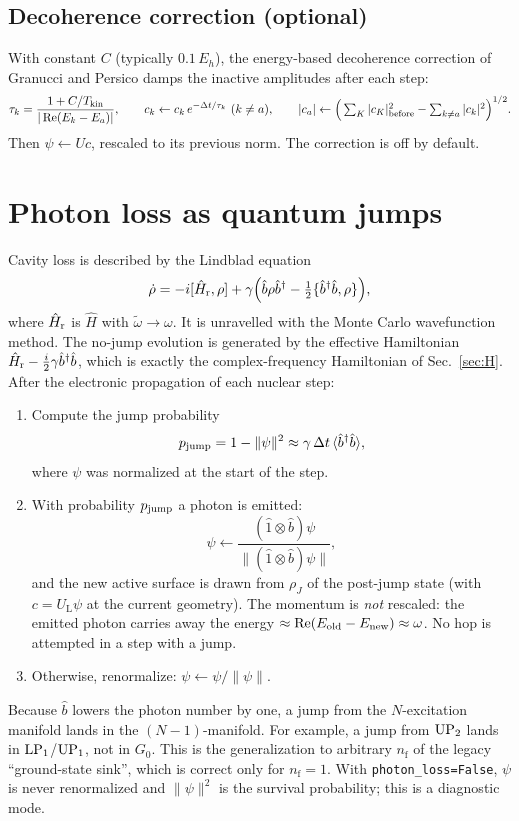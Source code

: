 \documentclass[11pt]{article}
\newcommand{\bdag}{\hat b^{\dagger}}
\newcommand{\bop}{\hat b}
\newcommand{\wt}{\tilde\omega}
\newcommand{\UL}{U_{\mathrm L}}
\newcommand{\Rep}{\operatorname{Re}}
\newcommand{\code}[1]{\texttt{#1}}
\newcommand{\nf}{n_{\mathrm f}}
\begin{document}
\subsection{Decoherence correction (optional)}
With constant $C$ (typically $0.1\,E_h$), the energy-based decoherence correction of Granucci and Persico damps the inactive amplitudes after each step:
\begin{equation}
\tau_k=\frac{1+C/T_{\rm kin}}{|\Rep(E_k-E_a)|},\qquad c_k\leftarrow c_k\,e^{-\Delta t/\tau_k}\ (k\neq a),\qquad
|c_a|\leftarrow\Big(\textstyle\sum_K|c_K|^2_{\rm before}-\sum_{k\neq a}|c_k|^2\Big)^{1/2}.
\end{equation}
Then $\psi\leftarrow Uc$, rescaled to its previous norm. The correction is off by default.

\section{Photon loss as quantum jumps}
\label{sec:jump}
Cavity loss is described by the Lindblad equation
\begin{equation}
\dot\rho=-i[\hat H_{\rm r},\rho]+\gamma\Big(\bop\rho\bdag-\tfrac12\{\bdag\bop,\rho\}\Big),
\end{equation}
where $\hat H_{\rm r}$ is $\hat H$ with $\wt\to\omega$. It is unravelled with the Monte Carlo wavefunction method. The no-jump evolution is generated by the effective Hamiltonian $\hat H_{\rm r}-\tfrac{i}{2}\gamma\bdag\bop$, which is exactly the complex-frequency Hamiltonian of Sec.~\ref{sec:H}. After the electronic propagation of each nuclear step:
\begin{enumerate}
\item Compute the jump probability
\begin{equation}
p_{\rm jump}=1-\|\psi\|^2\approx\gamma\,\Delta t\,\langle\bdag\bop\rangle,
\end{equation}
where $\psi$ was normalized at the start of the step.
\item With probability $p_{\rm jump}$ a photon is emitted:
\begin{equation}
\psi\leftarrow\frac{(\hat 1\otimes\bop)\psi}{\|(\hat 1\otimes\bop)\psi\|},
\end{equation}
and the new active surface is drawn from $\rho_J$ of the post-jump state (with $c=\UL\psi$ at the current geometry). The momentum is \emph{not} rescaled: the emitted photon carries away the energy $\approx\Rep(E_{\rm old}-E_{\rm new})\approx\omega$. No hop is attempted in a step with a jump.
\item Otherwise, renormalize: $\psi\leftarrow\psi/\|\psi\|$.
\end{enumerate}
Because $\bop$ lowers the photon number by one, a jump from the $N$-excitation manifold lands in the $(N-1)$-manifold. For example, a jump from ${\rm UP}_2$ lands in ${\rm LP}_1$/${\rm UP}_1$, not in $G_0$. This is the generalization to arbitrary $\nf$ of the legacy ``ground-state sink'', which is correct only for $\nf=1$. With \code{photon\_loss=False}, $\psi$ is never renormalized and $\|\psi\|^2$ is the survival probability; this is a diagnostic mode.
\end{document}
